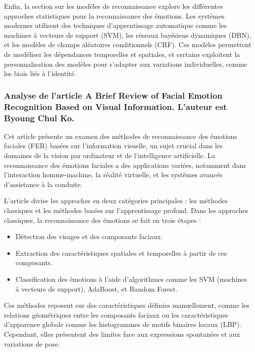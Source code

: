\documentclass{rapport}
\begin{document}
Enfin, la section sur les modèles de reconnaissance explore les différentes
approches statistiques pour la reconnaissance des émotions. Les systèmes modernes
utilisent des techniques d'apprentissage automatique comme les machines à vecteurs
de support (SVM), les réseaux bayésiens dynamiques (DBN), et les modèles de champs
aléatoires conditionnels (CRF). Ces modèles permettent de modéliser les dépendances
temporelles et spatiales, et certains exploitent la personnalisation des modèles
pour s’adapter aux variations individuelles, comme les biais liés à l'identité.

\subsubsection{Analyse de l'article \cite{koBriefReviewFacial2018} A Brief Review of Facial Emotion Recognition Based on Visual Information. L'auteur est Byoung Chul Ko.}

Cet article présente un examen des méthodes de reconnaissance des émotions faciales 
(FER) basées sur l'information visuelle, un sujet crucial dans les domaines de la 
vision par ordinateur et de l'intelligence artificielle. La reconnaissance des 
émotions faciales a des applications variées, notamment dans l'interaction 
homme-machine, la réalité virtuelle, et les systèmes avancés d'assistance à la conduite.

L'article divise les approches en deux catégories principales : les méthodes classiques 
et les méthodes basées sur l'apprentissage profond. Dans les approches classiques, 
la reconnaissance des émotions se fait en trois étapes :
\begin{itemize}
    \item Détection des visages et des composants faciaux.
    \item Extraction des caractéristiques spatiales et temporelles à partir de ces composants.
    \item Classification des émotions à l'aide d'algorithmes comme les SVM (machines à vecteurs de support), AdaBoost, et Random Forest.
\end{itemize}
Ces méthodes reposent sur des caractéristiques définies manuellement, comme les 
relations géométriques entre les composants faciaux ou les caractéristiques 
d'apparence globale comme les histogrammes de motifs binaires locaux (LBP). 
Cependant, elles présentent des limites face aux expressions spontanées et aux variations de pose.
\end{document}
